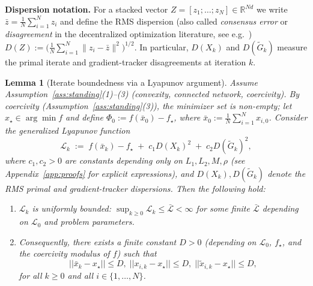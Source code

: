 \documentclass[10pt,twocolumn,letterpaper]{article}
\def\norm#1{||#1||}%
\theoremstyle{compact}
\newtheorem{lemma}[theorem]{Lemma}
\theoremstyle{compactremark}
\newcommand{\R}{\mathbb{R}}
\newcommand{\norm}[1]{\left\|#1\right\|}
\begin{document}
	\noindent\textbf{Dispersion notation.}
	For a stacked vector $Z=[z_1;\dots;z_N]\in\R^{Nd}$
	we write $\bar z=\frac1N\sum_{i=1}^N z_i$ and define the RMS dispersion
	(also called \emph{consensus error} or \emph{disagreement} in the
	decentralized optimization literature, see e.g.\
	\citet{nedic2009subgradient,nedic2017diging})
	\(
	  D(Z):=\bigl(\tfrac1N\sum_{i=1}^N\|z_i-\bar z\|^2\bigr)^{1/2}.
	\)
	In particular, $D(X_k)$ and $D(\tilde G_k)$ measure the primal
	iterate and gradient-tracker disagreements at iteration $k$.

	\begin{lemma}[Iterate boundedness via a Lyapunov argument]\label{lem:lyap_bound}
		Assume Assumption~\ref{ass:standing}(1)--(3) (convexity, connected network, coercivity).
		By coercivity (Assumption~\ref{ass:standing}(3)), the minimizer set is non-empty;
		let $x_\star\in\arg\min f$ and define
		$\Phi_0:=f(\bar x_0)-f_\star$, where $\bar x_0:=\frac1N\sum_{i=1}^N x_{i,0}$.
		Consider the generalized Lyapunov function
		\[
		\mathcal L_k \;:=\; f(\bar x_k)-f_\star \;+\; c_1 D(X_k)^2 \;+\; c_2 D(\tilde G_k)^2,
		\]
		where $c_1,c_2>0$ are constants depending only on $L_1,L_2,M,\rho$
		(see Appendix~\ref{app:proofs} for explicit expressions), and
		$D(X_k), D(\tilde G_k)$ denote the RMS primal and gradient-tracker dispersions.
		Then the following hold:
		\begin{enumerate}[leftmargin=1.2em,itemsep=2pt]
			\item $\mathcal L_k$ is uniformly bounded: $\sup_{k\ge 0}\mathcal L_k \le \bar{\mathcal L} < \infty$ for some finite $\bar{\mathcal L}$ depending on $\mathcal L_0$ and problem parameters.
			\item Consequently, there exists a finite constant $D>0$
			(depending on $\mathcal L_0$, $f_\star$, and the coercivity modulus of $f$)
			such that
			\begin{equation}\label{eq:bounded_levelset}
				\norm{\bar x_k\!-\!x_\star}\!\le\! D,\;
				\norm{x_{i,k}\!-\!x_\star}\!\le\! D,\;
				\norm{\tilde x_{i,k}\!-\!x_\star}\!\le\! D,
			\end{equation}
			for all $k\ge 0$ and all $i\in\{1,\dots,N\}$.
		\end{enumerate}
	\end{lemma}
\end{document}
